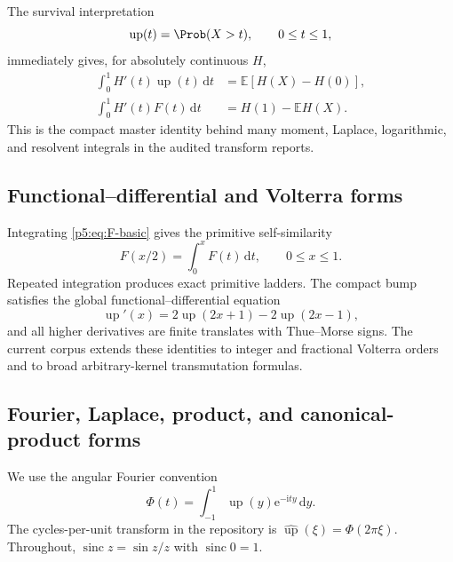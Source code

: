 \documentclass[11pt,oneside]{article}
\theoremstyle{definition}
\newcommand{\dd}{\,\mathrm d}
\newcommand{\e}{\mathrm e}
\newcommand{\ii}{\mathrm i}
\newcommand{\E}{\mathbb E}
\newcommand{\Up}{\operatorname{up}}
\newcommand{\sinc}{\operatorname{sinc}}
\begin{document}
The survival interpretation
\begin{equation}
 \Up(t)=\Prob(X>t),\qquad 0\le t\le1,                    \label{p5:eq:survival-probability}
\end{equation}
immediately gives, for absolutely continuous $H$,
\begin{align}
 \int_0^1H'(t)\Up(t)\dd t
   &=\E[H(X)-H(0)],                                      \label{p5:eq:master-survival}\\
 \int_0^1H'(t)F(t)\dd t
   &=H(1)-\E H(X).                                       \label{p5:eq:master-cdf}
\end{align}
This is the compact master identity behind many moment, Laplace, logarithmic,
and resolvent integrals in the audited transform reports.

\subsection{Functional--differential and Volterra forms}

\baseline Integrating \eqref{p5:eq:F-basic} gives the primitive self-similarity
\begin{equation}
 F(x/2)=\int_0^xF(t)\dd t,
 \qquad 0\le x\le1.                                     \label{p5:eq:volterra-basic}
\end{equation}
Repeated integration produces exact primitive ladders.  The compact bump
satisfies the global functional--differential equation
\begin{equation}
 \Up'(x)=2\Up(2x+1)-2\Up(2x-1),                         \label{p5:eq:up-differential}
\end{equation}
and all higher derivatives are finite translates with Thue--Morse signs.
The current corpus extends these identities to integer and fractional
Volterra orders and to broad arbitrary-kernel transmutation formulas.

\subsection{Fourier, Laplace, product, and canonical-product forms}

We use the angular Fourier convention
\begin{equation}
 \Phi(t)=\int_{-1}^{1}\Up(y)\e^{-\ii ty}\dd y.           \label{p5:eq:Phi-definition}
\end{equation}
The cycles-per-unit transform in the repository is
$\widehat{\Up}(\xi)=\Phi(2\pi\xi)$.  Throughout,
$\sinc z=\sin z/z$ with $\sinc0=1$.
\end{document}
